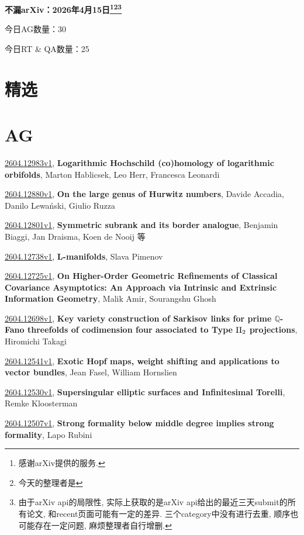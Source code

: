 \documentclass[9pt, a4paper]{article}
\theoremstyle{plain}
\theoremstyle{definition}
\theoremstyle{remark}
\newcommand{\arxiv}[3]{\href{https://arxiv.org/abs/#1}{#1}, \textbf{\textcolor{arxivblue}{#2}}, #3}
\newcommand{\AGnumber}{30}
\newcommand{\RTQAnumber}{25}
\newcommand{\NewestDate}{2026年4月15日}
\newcommand{\todayarXiver}{} %
\begin{document}
\begin{center}
    \Huge\textbf{不漏arXiv：\NewestDate\footnote{感谢arXiv提供的服务.}\footnote{今天的整理者是\todayarXiver}\footnote{由于arXiv api的局限性, 实际上获取的是arXiv api给出的最近三天submit的所有论文, 和recent页面可能有一定的差异. 三个category中没有进行去重, 顺序也可能存在一定问题, 麻烦整理者自行增删.}} \\
\end{center}

\setcounter{section}{-1}

\begin{center}
    今日AG数量：\AGnumber
    
    今日RT \& QA数量：\RTQAnumber
    
\end{center}


\section{精选}


\section{AG}
\arxiv{2604.12983v1}{Logarithmic Hochschild (co)homology of logarithmic orbifolds}{Marton Hablicsek, Leo Herr, Francesca Leonardi}

\arxiv{2604.12880v1}{On the large genus of Hurwitz numbers}{Davide Accadia, Danilo Lewański, Giulio Ruzza}

\arxiv{2604.12801v1}{Symmetric subrank and its border analogue}{Benjamin Biaggi, Jan Draisma, Koen de Nooij 等}

\arxiv{2604.12738v1}{L-manifolds}{Slava Pimenov}

\arxiv{2604.12725v1}{On Higher-Order Geometric Refinements of Classical Covariance Asymptotics: An Approach via Intrinsic and Extrinsic Information Geometry}{Malik Amir, Sourangshu Ghosh}

\arxiv{2604.12698v1}{Key variety construction of Sarkisov links for prime $\mathbb{Q}$-Fano threefolds of codimension four associated to Type ${\rm II}_{2}$ projections}{Hiromichi Takagi}

\arxiv{2604.12541v1}{Exotic Hopf maps, weight shifting and applications to vector bundles}{Jean Fasel, William Hornslien}

\arxiv{2604.12530v1}{Supersingular elliptic surfaces and Infinitesimal Torelli}{Remke Kloosterman}

\arxiv{2604.12507v1}{Strong formality below middle degree implies strong formality}{Lapo Rubini}
\end{document}

